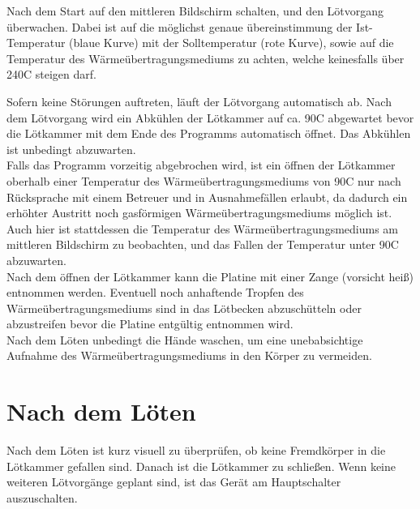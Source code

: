 \documentclass{\basedir/fablab-document}
\renewcommand{\todo}[1]{\textbf{\color{red}{TODO: #1}}}
\begin{document}

Nach dem Start auf den mittleren Bildschirm schalten, und den L{\"o}tvorgang {\"u}berwachen. Dabei ist auf die m{\"o}glichst genaue {\"u}bereinstimmung der Ist-Temperatur (blaue Kurve) mit der Solltemperatur (rote Kurve), sowie auf die Temperatur des W{\"a}rme{\"u}bertragungsmediums zu achten, welche keinesfalls {\"u}ber 240\textdegree C steigen darf. 


Sofern keine St{\"o}rungen auftreten, l{\"a}uft der L{\"o}tvorgang automatisch ab. Nach dem L{\"o}tvorgang wird ein Abk{\"u}hlen der L{\"o}tkammer auf ca. 90\textdegree C abgewartet bevor die L{\"o}tkammer mit dem Ende des Programms automatisch {\"o}ffnet. Das Abk{\"u}hlen ist unbedingt abzuwarten.\\

Falls das Programm vorzeitig abgebrochen wird, ist ein {\"o}ffnen der L{\"o}tkammer oberhalb einer Temperatur des W{\"a}rme{\"u}bertragungsmediums von 90\textdegree C nur nach R{\"u}cksprache mit einem Betreuer und in Ausnahmef{\"a}llen erlaubt, da dadurch ein erh{\"o}hter Austritt noch gasf{\"o}rmigen W{\"a}rme{\"u}bertragungsmediums m{\"o}glich ist. Auch hier ist stattdessen die Temperatur des W{\"a}rme{\"u}bertragungsmediums am mittleren Bildschirm zu beobachten, und das Fallen der Temperatur unter 90\textdegree C abzuwarten.\\

Nach dem {\"o}ffnen der L{\"o}tkammer kann die Platine mit einer Zange (vorsicht hei{\ss}) entnommen werden. Eventuell noch anhaftende Tropfen des W{\"a}rme{\"u}bertragungsmediums sind in das L{\"o}tbecken abzusch{\"u}tteln oder abzustreifen bevor die Platine entg{\"u}ltig entnommen wird.\\

Nach dem L{\"o}ten unbedingt die H{\"a}nde waschen, um eine unebabsichtige Aufnahme des W{\"a}rme{\"u}bertragungsmediums in den K{\"o}rper zu vermeiden.

\section{Nach dem L{\"o}ten}

Nach dem L{\"o}ten ist kurz visuell zu {\"u}berpr{\"u}fen, ob keine Fremdk{\"o}rper in die L{\"o}tkammer gefallen sind. Danach ist die L{\"o}tkammer zu schlie{\ss}en. Wenn keine weiteren L{\"o}tvorg{\"a}nge geplant sind, ist das Ger{\"a}t am Hauptschalter auszuschalten.
	\newpage
\end{document}
